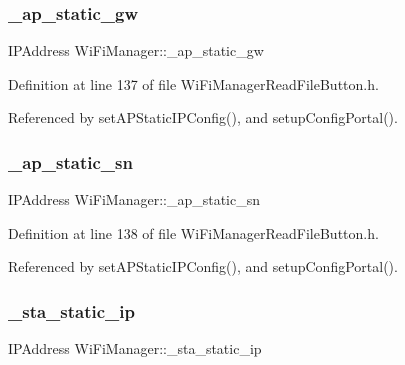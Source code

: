 \subsubsection{\texorpdfstring{\+\_\+ap\+\_\+static\+\_\+gw}{\_ap\_static\_gw}}
{\footnotesize\ttfamily I\+P\+Address Wi\+Fi\+Manager\+::\+\_\+ap\+\_\+static\+\_\+gw\hspace{0.3cm}{\ttfamily [private]}}



Definition at line 137 of file Wi\+Fi\+Manager\+Read\+File\+Button.\+h.



Referenced by set\+A\+P\+Static\+I\+P\+Config(), and setup\+Config\+Portal().

\mbox{\label{class_wi_fi_manager_a8122027aecd1a1dd9b60f21e87286808}} 
\subsubsection{\texorpdfstring{\+\_\+ap\+\_\+static\+\_\+sn}{\_ap\_static\_sn}}
{\footnotesize\ttfamily I\+P\+Address Wi\+Fi\+Manager\+::\+\_\+ap\+\_\+static\+\_\+sn\hspace{0.3cm}{\ttfamily [private]}}



Definition at line 138 of file Wi\+Fi\+Manager\+Read\+File\+Button.\+h.



Referenced by set\+A\+P\+Static\+I\+P\+Config(), and setup\+Config\+Portal().

\mbox{\label{class_wi_fi_manager_ad90d356096742a43b4540117b92faff0}} 
\subsubsection{\texorpdfstring{\+\_\+sta\+\_\+static\+\_\+ip}{\_sta\_static\_ip}}
{\footnotesize\ttfamily I\+P\+Address Wi\+Fi\+Manager\+::\+\_\+sta\+\_\+static\+\_\+ip\hspace{0.3cm}{\ttfamily [private]}}



